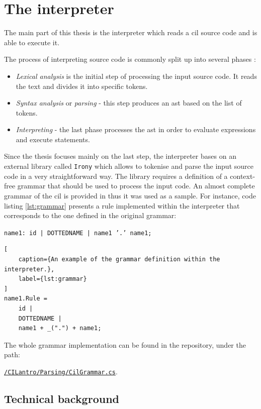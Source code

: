 \documentclass[declaration,shortabstract,english,mgr]{iithesis}
\begin{document}
\chapter{The interpreter}
\label{sec:interpreter}

The main part of this thesis is the interpreter which reads a \acrshort{cil} source code and is able to execute it.

The process of interpreting source code is commonly split up into several phases \cite{compilerDesign}:
\begin{itemize}
	\item{\textit{Lexical analysis} is the initial step of processing the input source code. It reads the text and divides it into specific tokens.}
	\item{\textit{Syntax analysis} or \textit{parsing} - this step produces an \acrshort{ast} based on the list of tokens.}
	\item{\textit{Interpreting} - the last phase processes the \acrshort{ast} in order to evaluate expressions and execute statements.}
\end{itemize}

Since the thesis focuses mainly on the last step, the interpreter bases on an external library called \texttt{Irony} which allows to tokenise and parse the input source code in a very straightforward way. The library requires a definition of a context-free grammar that should be used to process the input code. An almost complete grammar of the \acrshort{cil} is provided in \cite{ecmaStandard} thus it was used as a sample. For instance, code listing \ref{lst:grammar} presents a rule implemented within the interpreter that corresponds to the one defined in the original grammar:
\begin{center}
\texttt{name1: id
| DOTTEDNAME
| name1 '.' name1;}
\end{center}
\begin{lstlisting}[
	caption={An example of the grammar definition within the interpreter.},
	label={lst:grammar}
]
name1.Rule =
	id |
	DOTTEDNAME |
	name1 + _(".") + name1;
\end{lstlisting}
The whole grammar implementation can be found in the repository, under the path:
\begin{center}
	\href{https://github.com/kvasnyk/CILantro/blob/master/CILantro/CILantro/Parsing/CilGrammar.cs}{\texttt{/CILantro/Parsing/CilGrammar.cs}}.
\end{center}

\section{Technical background}
\end{document}
